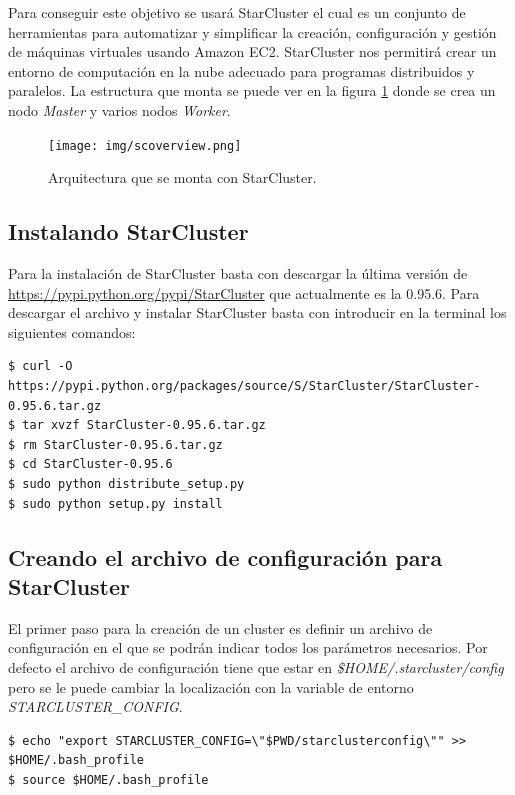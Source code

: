 \documentclass{article}
\begin{document}
	Para conseguir este objetivo se usará StarCluster el cual es un conjunto de herramientas para automatizar y simplificar la creación, configuración y gestión de máquinas virtuales usando Amazon EC2. StarCluster nos permitirá crear un entorno de computación en la nube adecuado para programas distribuidos y paralelos. La estructura que monta se puede ver en la figura \ref{fig:StarClusterOverview} donde se crea un nodo \emph{Master} y varios nodos \emph{Worker}.

\begin{figure}[h]
  \centering
    \texttt{[image: img/scoverview.png]}
  \caption{Arquitectura que se monta con StarCluster.}
  \label{fig:StarClusterOverview}
\end{figure}

\subsection{Instalando StarCluster}\label{sec:InstallStarCluster}
	Para la instalación de StarCluster basta con descargar la última versión de \url{https://pypi.python.org/pypi/StarCluster} que actualmente es la 0.95.6. Para descargar el archivo y instalar StarCluster basta con introducir en la terminal los siguientes comandos\cite{InstallingStarCluster}:
\begin{lstlisting}[style=minibash]
$ curl -O https://pypi.python.org/packages/source/S/StarCluster/StarCluster-0.95.6.tar.gz
$ tar xvzf StarCluster-0.95.6.tar.gz
$ rm StarCluster-0.95.6.tar.gz
$ cd StarCluster-0.95.6
$ sudo python distribute_setup.py
$ sudo python setup.py install
\end{lstlisting}

\subsection{Creando el archivo de configuración para StarCluster}
	El primer paso para la creación de un cluster es definir un archivo de configuración en el que se podrán indicar todos los parámetros necesarios. Por defecto el archivo de configuración tiene que estar en \emph{\$HOME/.starcluster/config} pero se le puede cambiar la localización con la variable de entorno \emph{STARCLUSTER\_CONFIG}\cite{StarClusterUserManual}.
\begin{lstlisting}[style=minibash]
$ echo "export STARCLUSTER_CONFIG=\"$PWD/starclusterconfig\"" >> $HOME/.bash_profile 
$ source $HOME/.bash_profile
\end{lstlisting}
\end{document}
